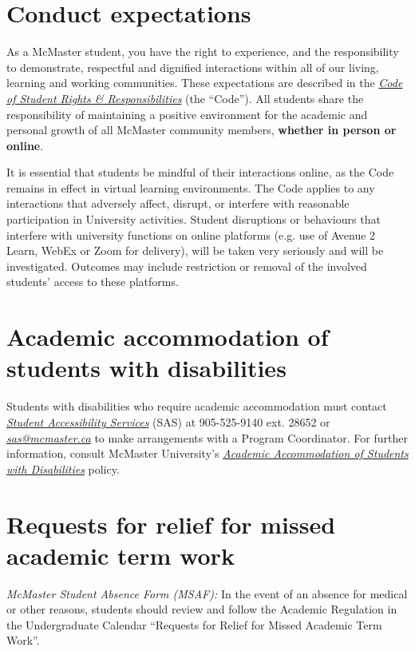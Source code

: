 \documentclass[12pt]{article}
\begin{document}
\begin{center}
\section*{Conduct expectations}

As a McMaster student, you have the right to experience, and the
responsibility to demonstrate, respectful and dignified interactions
within all of our living, learning and working communities. These
expectations are described in the
\href{https://secretariat.mcmaster.ca/app/uploads/Code-of-Student-Rights-and-Responsibilities.pdf}{\emph{\emph{Code
of Student Rights \& Responsibilities}}} (the ``Code''). All students
share the responsibility of maintaining a positive environment for the
academic and personal growth of all McMaster community members,
\textbf{whether in person or online}.

It is essential that students be mindful of their interactions online,
as the Code remains in effect in virtual learning environments. The Code
applies to any interactions that adversely affect, disrupt, or interfere
with reasonable participation in University activities. Student
disruptions or behaviours that interfere with university functions on
online platforms (e.g. use of Avenue 2 Learn, WebEx or Zoom for
delivery), will be taken very seriously and will be investigated.
Outcomes may include restriction or removal of the involved students'
access to these platforms.

\section*{Academic accommodation of students with disabilities}

Students with disabilities who require academic accommodation must
contact \href{https://sas.mcmaster.ca/}{\emph{Student Accessibility
Services}} (SAS) at 905-525-9140 ext. 28652 or
\href{mailto:sas@mcmaster.ca}{\emph{sas@mcmaster.ca}} to make
arrangements with a Program Coordinator. For further information,
consult McMaster University's
\href{https://secretariat.mcmaster.ca/app/uploads/Academic-Accommodations-Policy.pdf}{\emph{\emph{Academic
Accommodation of Students with Disabilities}}} policy.

\section*{Requests for relief for missed academic term work}

\emph{McMaster Student Absence Form (MSAF):} In the event of an absence
for medical or other reasons, students should review and follow the
Academic Regulation in the Undergraduate Calendar ``Requests for Relief
for Missed Academic Term Work''.


\end{center}
\end{document}
